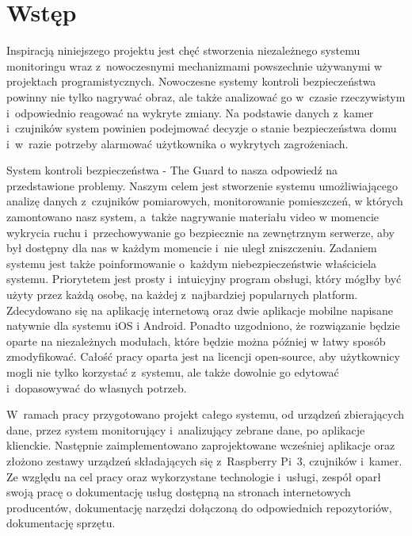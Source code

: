 \chapter{Wstęp}
Inspiracją niniejszego projektu jest chęć stworzenia niezależnego systemu monitoringu wraz z~nowoczesnymi mechanizmami powszechnie używanymi w projektach programistycznych.
Nowoczesne systemy kontroli bezpieczeństwa powinny nie tylko nagrywać obraz, ale także analizować go w~czasie rzeczywistym i~odpowiednio reagować na wykryte zmiany. Na podstawie danych z~kamer i~czujników system powinien podejmować decyzje o stanie bezpieczeństwa domu i~w~razie potrzeby alarmować użytkownika o wykrytych zagrożeniach.

System kontroli bezpieczeństwa - The Guard to nasza odpowiedź na przedstawione problemy. Naszym celem jest stworzenie systemu umożliwiającego analizę danych z~czujników pomiarowych, monitorowanie pomieszczeń, w których zamontowano nasz system, a~także nagrywanie materiału video w momencie wykrycia ruchu i~przechowywanie go bezpiecznie na zewnętrznym serwerze, aby był dostępny dla nas w każdym momencie i~nie uległ zniszczeniu. Zadaniem systemu jest także poinformowanie o~każdym niebezpieczeństwie właściciela systemu. Priorytetem jest prosty i~intuicyjny program obsługi, który mógłby być użyty przez każdą osobę, na każdej z~najbardziej popularnych platform. Zdecydowano się na aplikację internetową oraz dwie aplikacje mobilne napisane natywnie dla systemu iOS i Android. Ponadto uzgodniono, że rozwiązanie będzie oparte na niezależnych modułach, które będzie można później w łatwy sposób zmodyfikować. Całość pracy oparta jest na licencji open-source, aby użytkownicy mogli nie tylko korzystać z~systemu, ale także dowolnie go edytować i~dopasowywać do własnych potrzeb.

W~ramach pracy przygotowano projekt całego systemu, od urządzeń zbierających dane, przez system monitorujący i~analizujący zebrane dane, po aplikacje klienckie. Następnie zaimplementowano zaprojektowane wcześniej aplikacje oraz złożono zestawy urządzeń składających się z~Raspberry Pi~3, czujników i~kamer.
Ze względu na cel pracy oraz wykorzystane technologie i~usługi, zespół oparł swoją pracę o dokumentację usług dostępną na stronach internetowych producentów, dokumentację narzędzi dołączoną do odpowiednich repozytoriów, dokumentację sprzętu.

